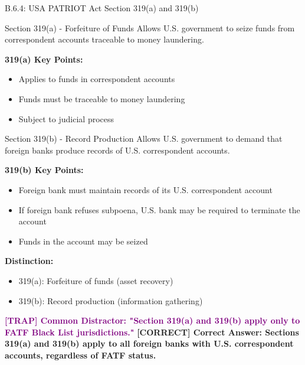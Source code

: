 \documentclass[11pt,a4paper]{beamer}
\newcommand{\trap}[1]{\textcolor{purple}{\textbf{[TRAP] #1}}}
\newcommand{\correct}[1]{\textcolor{green!50!black}{\textbf{[CORRECT] #1}}}
\begin{document}
	\begin{frame}{B.6.4: USA PATRIOT Act Section 319(a) and 319(b)}
		\begin{block}{Section 319(a) - Forfeiture of Funds}
			Allows U.S. government to seize funds from correspondent accounts traceable to money laundering.
		\end{block}
		\textbf{319(a) Key Points:}
		\begin{itemize}
			\item Applies to funds in correspondent accounts
			\item Funds must be traceable to money laundering
			\item Subject to judicial process
		\end{itemize}
		\begin{block}{Section 319(b) - Record Production}
			Allows U.S. government to demand that foreign banks produce records of U.S. correspondent accounts.
		\end{block}
		\textbf{319(b) Key Points:}
		\begin{itemize}
			\item Foreign bank must maintain records of its U.S. correspondent account
			\item If foreign bank refuses subpoena, U.S. bank may be required to terminate the account
			\item Funds in the account may be seized
		\end{itemize}
		\textbf{Distinction:}
		\begin{itemize}
			\item 319(a): Forfeiture of funds (asset recovery)
			\item 319(b): Record production (information gathering)
		\end{itemize}
		\trap{Common Distractor: "Section 319(a) and 319(b) apply only to FATF Black List jurisdictions."}
		\correct{Correct Answer: Sections 319(a) and 319(b) apply to all foreign banks with U.S. correspondent accounts, regardless of FATF status.}
	\end{frame}
	
\end{document}
